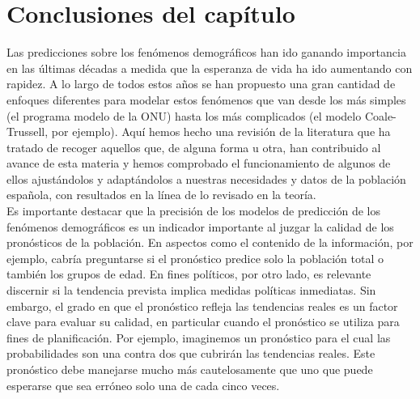 


\section{Conclusiones del capítulo}

Las predicciones sobre los fenómenos demográficos han ido ganando importancia en las últimas décadas a medida que la esperanza de vida ha ido aumentando con rapidez. A lo largo de todos estos años se han propuesto una gran cantidad de enfoques diferentes para modelar estos fenómenos que van desde los más simples (el programa modelo de la ONU) hasta los más complicados (el modelo Coale-Trussell, por ejemplo). Aquí hemos hecho una revisión de la literatura que ha tratado de recoger aquellos que, de alguna forma u otra, han contribuido al avance de esta materia y hemos comprobado el funcionamiento de algunos de ellos ajustándolos y adaptándolos a nuestras necesidades y datos de la población española, con resultados en la línea de lo revisado en la teoría.\\

Es importante destacar que la precisión de los modelos de predicción de los fenómenos demográficos es un indicador importante al juzgar la calidad de los pronósticos de la población. En aspectos como el contenido de la información, por ejemplo, cabría preguntarse si el pronóstico predice solo la población total o también los grupos de edad. En fines políticos, por otro lado, es relevante discernir si la tendencia prevista implica medidas políticas inmediatas. Sin embargo, el grado en que el pronóstico refleja las tendencias reales es un factor clave para evaluar su calidad, en particular cuando el pronóstico se utiliza para fines de planificación. Por ejemplo, imaginemos un pronóstico para el cual las probabilidades son una contra dos que cubrirán las tendencias reales. Este pronóstico debe manejarse mucho más cautelosamente que uno que puede esperarse que sea erróneo solo una de cada cinco veces.\\

